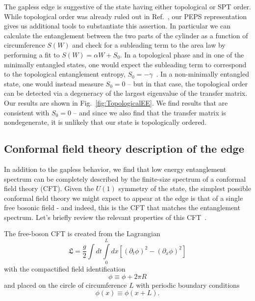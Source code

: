 The gapless edge is suggestive of the state having either topological or SPT order.
While topological order was already ruled out in Ref.~\cite{kimchi2013}, our PEPS
representation gives us additional tools to substantiate this assertion. In particular
we can calculate the entanglement between the two parts of the cylinder as a function
of circumference $S(W)$ and check for a subleading term to the area law by performing
a fit to $S(W) = \alpha W + S_0$. In a topological phase and in one of the minimally entangled
states, one would expect the subleading term to correspond to the topological entanglement
entropy, $S_0 = -\gamma$~\cite{kitaev2006, levin2006, jiang2012}.
In a non-minimally entangled state, one would instead measure $S_0 = 0$
-- but in that case, the topological order can be detected via a degeneracy of
 the largest eigenvalue of the transfer matrix.
Our results are shown in Fig.~\ref{fig:TopologicalEE}. We find results that are consistent
with $S_0 = 0$ -- and since we also find that the transfer matrix is nondegenerate,
it is unlikely that our state is topologically ordered.

\subsection{Conformal field theory description of the edge}
\label{sec:CFT}

In addition to the gapless behavior, we find that low energy entanglement spectrum
can be completely described by the finite-size spectrum of a conformal field theory (CFT). 
Given the $U(1)$ symmetry of the state, the simplest possible
conformal field theory we might expect to appear at the edge is that
of a single free bosonic field - and indeed, this is the CFT that matches the 
entanglement spectrum.
Let's briefly review the relevant properties of this CFT~\cite{difrancesco}.

The free-boson CFT is created from the Lagrangian
\begin{equation}
\mathfrak{L} = \frac{g}{2}\int dt \int\limits_0^L dx \left[ (\partial_t \phi)^2 - (\partial_x \phi)^2 \right]
\end{equation}
with the compactified field identification
\begin{equation}
\phi \equiv \phi + 2\pi R
\end{equation}
and placed on the circle of circumference $L$ with periodic boundary conditions
\begin{equation}
\phi(x) \equiv \phi(x+L).
\end{equation}


